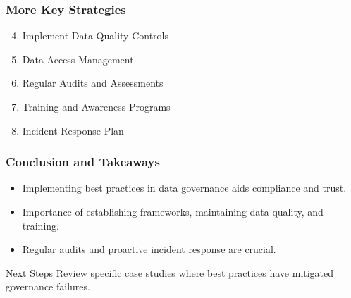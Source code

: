 \documentclass[aspectratio=169]{beamer}
\begin{document}
\begin{frame}[fragile]
    \frametitle{More Key Strategies}
    \begin{enumerate}
        \setcounter{enumi}{3}
        \item Implement Data Quality Controls
        \item Data Access Management
        \item Regular Audits and Assessments
        \item Training and Awareness Programs
        \item Incident Response Plan
    \end{enumerate}
\end{frame}

\begin{frame}[fragile]
    \frametitle{Conclusion and Takeaways}
    \begin{itemize}
        \item Implementing best practices in data governance aids compliance and trust.
        \item Importance of establishing frameworks, maintaining data quality, and training.
        \item Regular audits and proactive incident response are crucial.
    \end{itemize}
    \begin{block}{Next Steps}
        Review specific case studies where best practices have mitigated governance failures.
    \end{block}
\end{frame}
\end{document}
